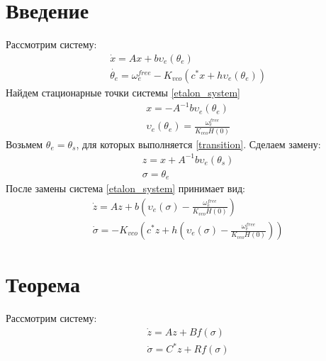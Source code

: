 \documentclass[a4paper]{article}
\begin{document}

\section{Введение}
Рассмотрим систему:
 \begin{equation}\label{etalon_system}
 \begin{aligned}
 &\dot{x} = Ax + b\upsilon_e(\theta_e)\\
 &\dot{\theta_e} = \omega_e^{free} - K_{vco}(c^*x + h\upsilon_e(\theta_e))
 \end{aligned}
\end{equation}
Найдем стационарные точки системы \eqref{etalon_system}
 \begin{equation}\label{transition}
 \begin{aligned}
 &x = -A^{-1}b\upsilon_e(\theta_e)\\
 &\upsilon_e(\theta_e) = \frac{\omega_e^{free}}{K_{vco}H(0)}
 \end{aligned}
\end{equation}
Возьмем $\theta_e = \theta_s$, для которых выполняется \eqref{transition}. Сделаем замену:
 \begin{equation}\label{replacement1}
 \begin{aligned}
 &z =x + A^{-1}b\upsilon_e(\theta_s)\\
 &\sigma = \theta_e 
 \end{aligned}
\end{equation}
После замены система \eqref{etalon_system} принимает вид:
 \begin{equation}
 \begin{aligned}
 &\dot{z} = Az + b(\upsilon_e(\sigma) - \frac{\omega_e^{free}}{K_{vco}H(0)})\\
 &\dot{\sigma} = -K_{vco}(c^*z + h(\upsilon_e(\sigma) - \frac{\omega_e^{free}}{K_{vco}H(0)}))
 \end{aligned}
\end{equation}

\section{Теорема}
Рассмотрим систему:
 \begin{equation}\label{system}
 \begin{aligned}
 &\dot{z} = Az + Bf(\sigma)\\
 &\dot{\sigma} = C^*z + Rf(\sigma)
 \end{aligned}
\end{equation}
\end{document}
